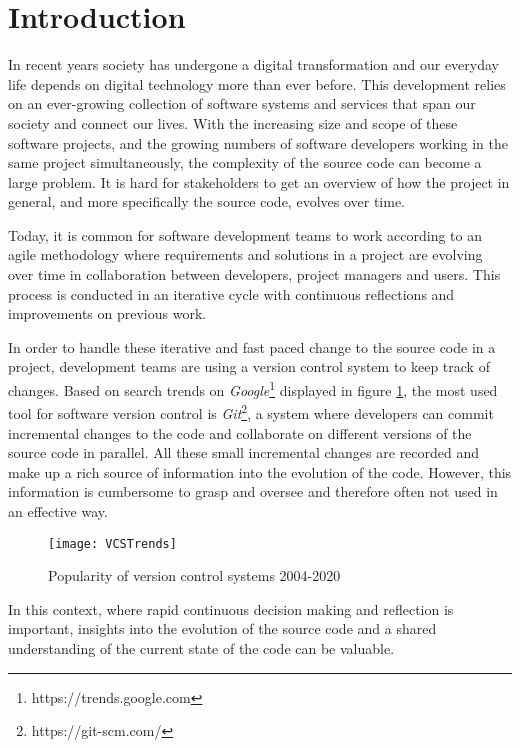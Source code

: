 

\section{Introduction}
In recent years society has undergone a digital transformation and our everyday life depends on digital technology more than ever before. This development relies on an ever-growing collection of software systems and services that span our society and connect our lives. With the increasing size and scope of these software projects, and the growing numbers of software developers working in the same project simultaneously, the complexity of the source code can become a large problem. It is hard for stakeholders to get an overview of how the project in general, and more specifically the source code, evolves over time.

Today, it is common for software development teams to work according to an agile methodology \cite{hazzan_agile_2014} where requirements and solutions in a project are evolving over time in collaboration between developers, project managers and users. This process is conducted in an iterative cycle with continuous reflections and improvements on previous work.

In order to handle these iterative and fast paced change to the source code in a project, development teams are using a version control system to keep track of changes. Based on search trends on \textit{Google}\footnote{https://trends.google.com} displayed in figure \ref{fig:vcstrends}, the most used tool for software version control is \textit{Git}\footnote{https://git-scm.com/}, a system where developers can commit incremental changes to the code and collaborate on different versions of the source code in parallel. All these small incremental changes are recorded and make up a rich source of information into the evolution of the code. However, this information is cumbersome to grasp and oversee and therefore often not used in an effective way.

\begin{figure}[b]
  \texttt{[image: VCSTrends]}
  \caption[VCS Trends]{Popularity of version control systems 2004-2020}
  \label{fig:vcstrends}
  \centering
\end{figure}

In this context, where rapid continuous decision making and reflection is important, insights into the evolution of the source code and a shared understanding of the current state of the code can be valuable. \cite{ball_if_1997}

